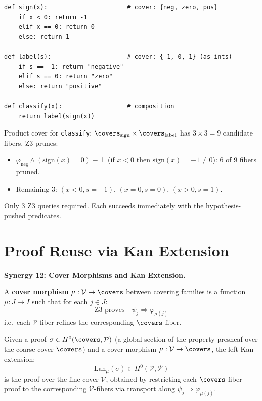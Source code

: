 \begin{example}
\label{ex:kunneth-example}
\begin{lstlisting}
def sign(x):                      # cover: {neg, zero, pos}
    if x < 0: return -1
    elif x == 0: return 0
    else: return 1

def label(s):                     # cover: {-1, 0, 1} (as ints)
    if s == -1: return "negative"
    elif s == 0: return "zero"
    else: return "positive"

def classify(x):                  # composition
    return label(sign(x))
\end{lstlisting}
Product cover for \texttt{classify}:
$\covers_{\mathrm{sign}} \times \covers_{\mathrm{label}}$ has
$3 \times 3 = 9$ candidate fibers.  Z3 prunes:
\begin{itemize}
\item $\varphi_{\mathrm{neg}} \wedge (\mathrm{sign}(x) = 0) \equiv \bot$
  (if $x<0$ then $\mathrm{sign}(x) = -1 \ne 0$): 6 of 9 fibers pruned.
\item Remaining 3: $(x<0, s=-1)$, $(x=0, s=0)$, $(x>0, s=1)$.
\end{itemize}
Only 3 Z3 queries required.  Each succeeds immediately with the
hypothesis-pushed predicates.
\end{example}


\section{Proof Reuse via Kan Extension}
\label{sec:kan-extension}

\noindent\textbf{Synergy 12: Cover Morphisms and Kan Extension.}

\begin{definition}
\label{def:cover-morphism}
A \textbf{cover morphism} $\mu : \mathcal{V} \to \covers$ between covering
families is a function $\mu : J \to I$ such that for each $j \in J$:
\[
  \text{Z3 proves}\quad \psi_j \Rightarrow \varphi_{\mu(j)}
\]
i.e.\ each $\mathcal{V}$-fiber refines the corresponding $\covers$-fiber.
\end{definition}

\begin{theorem}
\label{thm:kan-extension}
Given a proof $\sigma \in H^0(\covers, \mathcal{P})$ (a global section of
the property presheaf over the coarse cover $\covers$) and a cover morphism
$\mu : \mathcal{V} \to \covers$, the left Kan extension:
\[
  \mathrm{Lan}_\mu(\sigma) \in H^0(\mathcal{V}, \mathcal{P})
\]
is the proof over the fine cover $\mathcal{V}$, obtained by restricting
each $\covers$-fiber proof to the corresponding $\mathcal{V}$-fibers via
transport along $\psi_j \Rightarrow \varphi_{\mu(j)}$.
\end{theorem}

